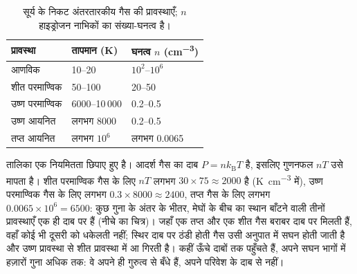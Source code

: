 \begin{table}[htbp]
\centering
\small
\begin{tabular}{lll}
\hline
प्रावस्था & तापमान (K) & घनत्व $n$ (\unit{cm^{-3}}) \\
\hline
आणविक & 10--20 & $10^2$--$10^6$ \\
शीत परमाण्विक & 50--100 & 20--50 \\
उष्ण परमाण्विक & 6000--10\,000 & 0.2--0.5 \\
उष्ण आयनित & लगभग 8000 & 0.2--0.5 \\
तप्त आयनित & लगभग $10^6$ & लगभग 0.0065 \\
\hline
\end{tabular}
\caption{सूर्य के निकट अंतरतारकीय गैस की प्रावस्थाएँ; $n$ हाइड्रोजन नाभिकों का
संख्या-घनत्व है।}
\label{tab:b2:ism-star-formation:phases}
\end{table}

तालिका एक नियमितता छिपाए हुए है। आदर्श गैस का दाब
$P = n k_{\mathrm B} T$ है, इसलिए गुणनफल $nT$ उसे मापता है। शीत परमाण्विक
गैस के लिए $nT$ लगभग $30\times75 \approx 2000$ है (\unit{K.cm^{-3}} में), उष्ण
परमाण्विक गैस के लिए लगभग $0.3\times8000 \approx 2400$, तप्त गैस के लिए लगभग
$0.0065\times10^6 = 6500$: कुछ गुना के अंतर के भीतर, मेघों के बीच का स्थान बाँटने वाली
तीनों प्रावस्थाएँ एक ही दाब पर हैं (नीचे का चित्र)।
जहाँ एक तप्त और एक शीत गैस बराबर दाब पर मिलती हैं, वहाँ कोई भी दूसरी को
धकेलती नहीं; स्थिर दाब पर ठंडी होती गैस उसी अनुपात में सघन होती जाती है और
उष्ण प्रावस्था से शीत प्रावस्था में आ गिरती है।  कहीं ऊँचे दाबों तक पहुँचते हैं, अपने सघन भागों में हज़ारों गुना अधिक तक: वे अपने ही गुरुत्व से बँधे हैं, अपने परिवेश के
दाब से नहीं।

